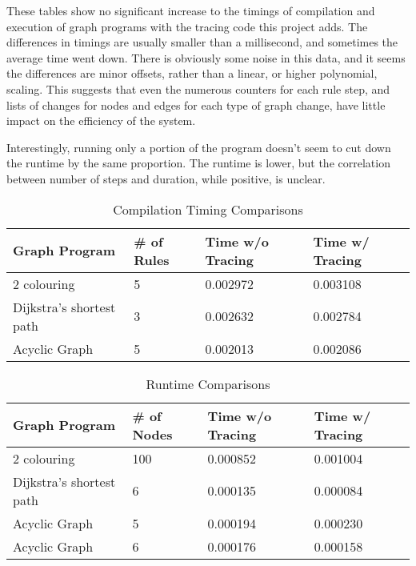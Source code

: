 \documentclass{UoYCSproject}
\begin{document}
These tables show no significant increase to the timings of compilation and execution of graph programs with the tracing code this project adds. The differences in timings are usually smaller than a millisecond, and sometimes the average time went down. There is obviously some noise in this data, and it seems the differences are minor offsets, rather than a linear, or higher polynomial, scaling. This suggests that even the numerous counters for each rule step, and lists of changes for nodes and edges for each type of graph change, have little impact on the efficiency of the system.

Interestingly, running only a portion of the program doesn't seem to cut down the runtime by the same proportion. The runtime is lower, but the correlation between number of steps and duration, while positive, is unclear.

\begin{table}
\centering
\begin{tabular}{p{4cm} | l | l | l}
	Graph Program & \# of Rules & Time w/o Tracing & Time w/ Tracing \\ 
	\hline
	2 colouring              & 5 & 0.002972 & 0.003108 \\
	Dijkstra's shortest path & 3 & 0.002632 & 0.002784 \\
	Acyclic Graph            & 5 & 0.002013 & 0.002086 \\
\end{tabular}
\caption{Compilation Timing Comparisons}
\label{table:compilation_timings}
\end{table}

\begin{table}
\centering
\begin{tabular}{p{4cm} | l | l | l}
	Graph Program & \# of Nodes & Time w/o Tracing & Time w/ Tracing \\ 
	\hline
	2 colouring              & 100 & 0.000852 & 0.001004 \\
	Dijkstra's shortest path & 6   & 0.000135 & 0.000084 \\
	Acyclic Graph            & 5   & 0.000194 & 0.000230 \\
	Acyclic Graph            & 6   & 0.000176 & 0.000158 \\
\end{tabular}
\caption{Runtime Comparisons}
\label{table:whole_execution_timings}
\end{table}
\end{document}

